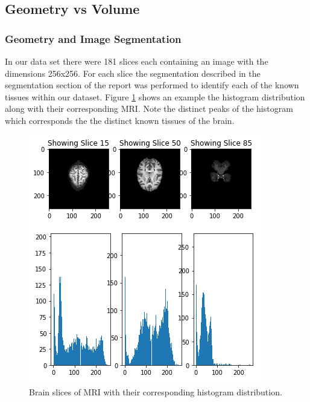 \subsection{Geometry vs Volume}

\subsubsection{Geometry and Image Segmentation}
In our data set there were 181 slices each containing an image with the dimensions 256x256.  For each slice the segmentation described in the segmentation section of the report was performed to identify each of the known tissues within our dataset.  Figure \ref{fig:resultsHistogram} shows an example the histogram distribution along with their corresponding MRI. Note the distinct peaks of the histogram which corresponds the the distinct known tissues of the brain.\\ 

\begin{figure}[h]
  \centering
  \includegraphics[width=\linewidth]{pictures/resultsHistogram.png}
  \caption{Brain slices of MRI with their corresponding histogram distribution.}
  \label{fig:resultsHistogram}
\end{figure}

